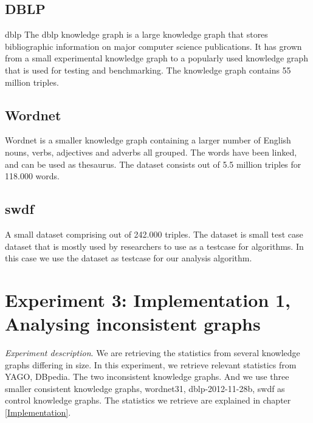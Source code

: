 \documentclass[11pt,letterpaper ,oneside ]{book}
\begin{document}
	\subsection{DBLP}
	dblp\cite{DBLP} The dblp knowledge graph is a large knowledge graph that stores bibliographic information on major computer science publications. It has grown from a small experimental knowledge graph to a popularly used knowledge graph that is used for testing and benchmarking. The knowledge graph contains 55 million triples.
	
	\subsection{Wordnet}
	Wordnet is a smaller knowledge graph containing a larger number of English nouns, verbs, adjectives and adverbs all grouped. The words have been linked, and can be used as thesaurus. The dataset consists out of 5.5 million triples for 118.000 words.
	
	\subsection{swdf}
	A small dataset comprising out of 242.000 triples. The dataset is small test case dataset that is mostly used by researchers to use as a testcase for algorithms. In this case we use the dataset as testcase for our analysis algorithm.
	
	\section{Experiment 3: Implementation 1, Analysing inconsistent graphs}
	\textit{Experiment description}. We are retrieving the statistics from several knowledge graphs differing in size. In this experiment, we retrieve relevant statistics from YAGO, DBpedia. The two inconsistent knowledge graphs. And we use three smaller consistent knowledge graphs, wordnet31, dblp-2012-11-28b, swdf as control knowledge graphs. The statistics we retrieve are explained in chapter \ref{Implementation}.  \\
	
\end{document}
